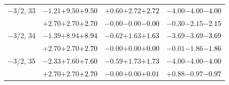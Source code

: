 \documentclass[compress]{beamer}
\begin{document}
\begin{frame}
\begin{tabular}{r | c | c | c}
$-$3/2, 33 & $-1.21$\hspace{0.1 cm}$+9.50$\hspace{0.1 cm}\textcolor{black}{$+9.50$} & $+0.60$\hspace{0.1 cm}$+2.72$\hspace{0.1 cm}\textcolor{black}{$+2.72$} & $-4.00$\hspace{0.1 cm}$-4.00$\hspace{0.1 cm}\textcolor{black}{$-4.00$} \\
           & $+2.70$\hspace{0.1 cm}$+2.70$\hspace{0.1 cm}\textcolor{black}{$+2.70$} & $-0.00$\hspace{0.1 cm}$-0.00$\hspace{0.1 cm}\textcolor{black}{$-0.00$} & $-0.30$\hspace{0.1 cm}$-2.15$\hspace{0.1 cm}\textcolor{black}{$-2.15$} \\
$-$3/2, 34 & $-1.39$\hspace{0.1 cm}$+8.94$\hspace{0.1 cm}\textcolor{black}{$+8.94$} & $-0.62$\hspace{0.1 cm}$+1.63$\hspace{0.1 cm}\textcolor{black}{$+1.63$} & $-3.69$\hspace{0.1 cm}$-3.69$\hspace{0.1 cm}\textcolor{black}{$-3.69$} \\
           & $+2.70$\hspace{0.1 cm}$+2.70$\hspace{0.1 cm}\textcolor{black}{$+2.70$} & $-0.00$\hspace{0.1 cm}$+0.00$\hspace{0.1 cm}\textcolor{black}{$+0.00$} & $-0.01$\hspace{0.1 cm}$-1.86$\hspace{0.1 cm}\textcolor{black}{$-1.86$} \\
$-$3/2, 35 & $-2.33$\hspace{0.1 cm}$+7.60$\hspace{0.1 cm}\textcolor{black}{$+7.60$} & $-0.59$\hspace{0.1 cm}$+1.73$\hspace{0.1 cm}\textcolor{black}{$+1.73$} & $-4.00$\hspace{0.1 cm}$-4.00$\hspace{0.1 cm}\textcolor{black}{$-4.00$} \\
           & $+2.70$\hspace{0.1 cm}$+2.70$\hspace{0.1 cm}\textcolor{black}{$+2.70$} & $-0.00$\hspace{0.1 cm}$+0.00$\hspace{0.1 cm}\textcolor{black}{$+0.01$} & $+0.88$\hspace{0.1 cm}$-0.97$\hspace{0.1 cm}\textcolor{black}{$-0.97$} \\

\end{tabular}
\end{frame}
\end{document}
